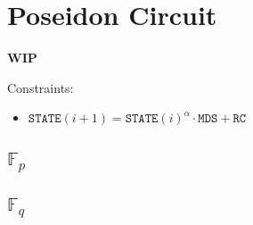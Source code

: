 \section{Poseidon Circuit}
\label{section:poseidon}
\textbf{WIP}

Constraints:
\begin{itemize}
	\item $\texttt{STATE}(i+1) = \texttt{STATE}(i)^\alpha \cdot \texttt{MDS} + \texttt{RC}$
\end{itemize}

\subsection{$\mathbb{F}_p$}

\subsection{$\mathbb{F}_q$}